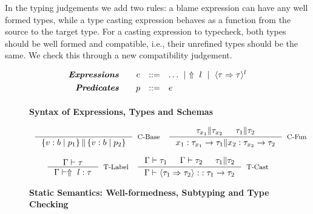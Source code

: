 In the typing judgements we add two rules:
a blame expression can have any well formed types, 
while a type casting expression behaves as a function from the 
source to the target type.
For a casting expression to typecheck, both types should be 
well formed and compatible, i.e., their unrefined types should be 
the same. We check this through a new compatibility judgement.

\begin{figure}[ht!]
\centering
$$
\begin{array}{rrcl}
\emphbf{Expressions} \quad 
  & e 
  & ::= 
  & 		 \dots
  \spmid \elabel{l} 
  \spmid \ecast{\tau}{\tau}{l} 
  \\[0.05in] 

\emphbf{Predicates} \quad 
  & p
  & ::= 
  &		e
  \\[0.05in] 

\end{array}
$$
\caption{\textbf{Syntax of Expressions, Types and Schemas}}
\label{fig:syntax}
\end{figure}


\begin{figure}[ht!]

\medskip {}
$$\begin{array}{cc}

\inference
  {}
  {\isCompatible{\tref{b}{p_1}}{\tref{b}{p_2}}}
  [\cbase]

&

\inference
  {\isCompatible{\tau_{x_1}}{\tau_{x_2}} &&
   \isCompatible{\tau_1}{\tau_2}}
  {\isCompatible{\tfun{x_1}{\tau_{x_1}}{\tau_1}}{\tfun{x_2}{\tau_{x_2}}{\tau_2}}}
  [\cfunction]
\end{array}$$



\medskip {}
$$\begin{array}{cc}

\inference
  {\isWellFormed{\Gamma}{\tau}}
  {\hastype{\Gamma}{\elabel{l}}{\tau}}
  [\tlabel]

&

\inference
  {\isWellFormed{\Gamma}{\tau_1} &&
   \isWellFormed{\Gamma}{\tau_2} && 
   \isCompatible{\tau_1}{\tau_2}}
  {\hastype{\Gamma}{\ecast{\tau_1}{\tau_2}{}}{\tfun{}{\tau_1}{\tau_2}}}
  [\tcast]
\end{array}$$


\caption{\textbf{Static Semantics: Well-formedness, Subtyping and Type Checking}}
\label{fig:rules}
\end{figure}


